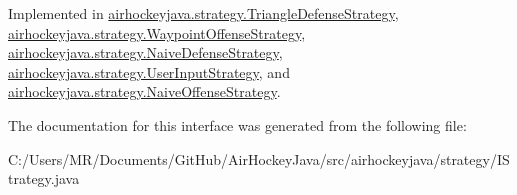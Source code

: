 Implemented in \hyperlink{classairhockeyjava_1_1strategy_1_1_triangle_defense_strategy_ac15219bfdfff130eb7df84b9d4e20c24}{airhockeyjava.\+strategy.\+Triangle\+Defense\+Strategy}, \hyperlink{classairhockeyjava_1_1strategy_1_1_waypoint_offense_strategy_a04eac2b8a2c2b9fcdcac0f6735f8785f}{airhockeyjava.\+strategy.\+Waypoint\+Offense\+Strategy}, \hyperlink{classairhockeyjava_1_1strategy_1_1_naive_defense_strategy_aa6f905456fdf94c934c37b3a7d09d857}{airhockeyjava.\+strategy.\+Naive\+Defense\+Strategy}, \hyperlink{classairhockeyjava_1_1strategy_1_1_user_input_strategy_abfc82d3a4457e6ec07fce1b1a0ff9abc}{airhockeyjava.\+strategy.\+User\+Input\+Strategy}, and \hyperlink{classairhockeyjava_1_1strategy_1_1_naive_offense_strategy_ace0bcde8dbe5254e0c866b52f857ba9a}{airhockeyjava.\+strategy.\+Naive\+Offense\+Strategy}.



The documentation for this interface was generated from the following file\+:\begin{DoxyCompactItemize}
\item 
C\+:/\+Users/\+M\+R/\+Documents/\+Git\+Hub/\+Air\+Hockey\+Java/src/airhockeyjava/strategy/I\+Strategy.\+java\end{DoxyCompactItemize}
